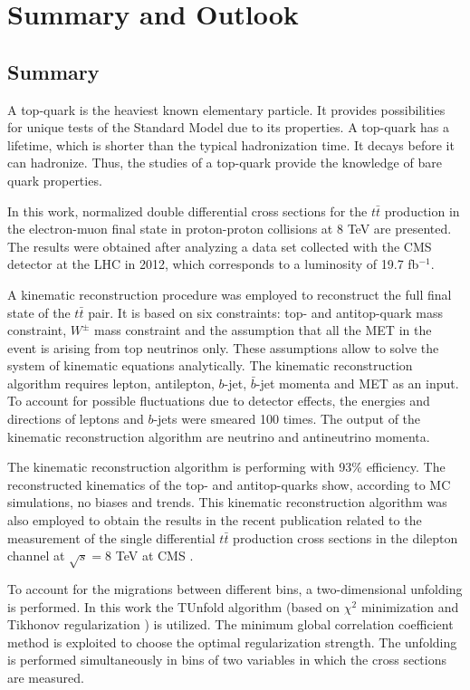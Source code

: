 \chapter{Summary and Outlook}\label{chapt:conc}

\section{Summary}

A top-quark is the heaviest known elementary particle. It provides possibilities for unique tests of the Standard
Model due to its properties. A top-quark has a lifetime, which is shorter than the typical hadronization time.
It decays before it can hadronize. Thus, the studies of a top-quark provide the knowledge of bare quark 
properties.

In this work, normalized double differential cross sections for the $t\bar{t}$ production in the electron-muon final state 
in proton-proton collisions at 8 TeV are presented.
The results were obtained after analyzing a data set collected with the CMS detector at the LHC in 2012, which corresponds to a 
luminosity of 19.7 fb$^{-1}$.

A kinematic reconstruction procedure was employed to reconstruct the full final state of the $t\bar{t}$ pair. It is based on six constraints:
top- and antitop-quark mass constraint, $W^{\pm}$ mass constraint and the assumption that all the MET in the event is arising
from top neutrinos only. These assumptions allow to solve the system of kinematic equations analytically. The kinematic reconstruction
algorithm requires lepton, antilepton, $b$-jet, $\bar{b}$-jet momenta and MET as an input. To account for possible fluctuations due 
to detector effects, the energies and directions of leptons and $b$-jets were smeared 100 times. The output of the kinematic reconstruction
algorithm are neutrino and antineutrino momenta.

The kinematic reconstruction algorithm is performing with 93\% efficiency. The reconstructed kinematics of the top- and antitop-quarks
show, according to MC simulations, no biases and trends. This kinematic reconstruction algorithm was also employed to obtain the 
results in the recent publication related
to the measurement of the single differential $t\bar{t}$ production cross sections in the dilepton channel at $\sqrt{s} = $8 TeV
at CMS \cite{Khachatryan:2015oqa}.

To account for the migrations between different bins, a two-dimensional unfolding is performed. In this work the TUnfold 
algorithm\cite{Schmitt:2012kp} (based on $\chi^{2}$ minimization and Tikhonov regularization \cite{Tikhonov:1963}) is utilized. 
The minimum global correlation coefficient method\cite{VBlobelT} is exploited to choose the 
optimal regularization strength. The unfolding is performed simultaneously in bins of two variables in which the cross
sections are measured.

